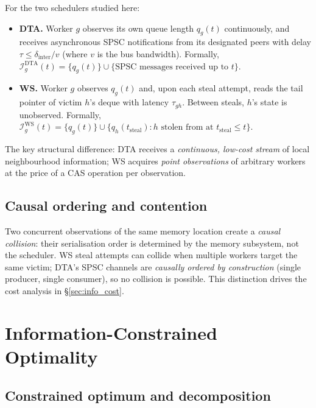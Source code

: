 \documentclass[11pt,a4paper]{article}
\begin{document}
For the two schedulers studied here:
\begin{itemize}
  \item \textbf{DTA.} Worker $g$ observes its own queue length $q_g(t)$
        continuously, and receives asynchronous SPSC notifications from
        its designated peers with delay $\tau \leq \delta_{\mathrm{inter}}/v$
        (where $v$ is the bus bandwidth).
        Formally, $\mathcal{I}_g^{\mathrm{DTA}}(t)
        = \{q_g(t)\} \cup \{\text{SPSC messages received up to }t\}$.

  \item \textbf{WS.} Worker $g$ observes $q_g(t)$ and, upon each steal
        attempt, reads the tail pointer of victim $h$'s deque with latency
        $\tau_{gh}$.  Between steals, $h$'s state is unobserved.
        Formally, $\mathcal{I}_g^{\mathrm{WS}}(t)
        = \{q_g(t)\} \cup \{q_h(t_{\mathrm{steal}}) : h \text{ stolen from at } t_{\mathrm{steal}} \leq t\}$.
\end{itemize}

The key structural difference: DTA receives a \emph{continuous, low-cost
stream} of local neighbourhood information; WS acquires \emph{point
observations} of arbitrary workers at the price of a CAS operation per
observation.

\subsection{Causal ordering and contention}

Two concurrent observations of the same memory location create a
\emph{causal collision}: their serialisation order is determined by the
memory subsystem, not the scheduler.  WS steal attempts can collide when
multiple workers target the same victim; DTA's SPSC channels are
\emph{causally ordered by construction} (single producer, single consumer),
so no collision is possible.  This distinction drives the cost analysis
in \S\ref{sec:info_cost}.

\section{Information-Constrained Optimality}
\label{sec:info_optimality}

\subsection{Constrained optimum and decomposition}
\end{document}
